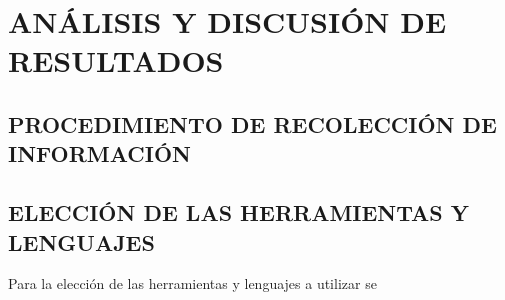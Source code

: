 \thispagestyle{empty}

\section{ANÁLISIS Y DISCUSIÓN DE RESULTADOS}

\subsection{PROCEDIMIENTO DE RECOLECCIÓN DE INFORMACIÓN}

\subsection{ELECCIÓN DE LAS HERRAMIENTAS Y LENGUAJES}
    Para la elección de las herramientas y lenguajes a utilizar se





